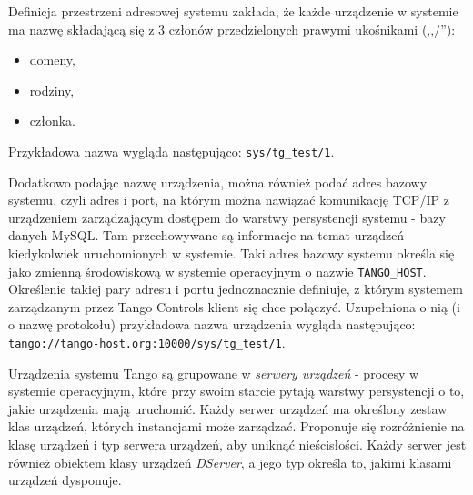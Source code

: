 Definicja przestrzeni adresowej systemu zakłada, że każde urządzenie w systemie ma nazwę składającą się z 3 członów przedzielonych prawymi ukośnikami (,,/''):
\begin{itemize}
    \item domeny,
    \item rodziny,
    \item członka.
\end{itemize}
Przykładowa nazwa wygląda następująco: \texttt{sys/tg\_test/1}.

Dodatkowo podając nazwę urządzenia, można również podać adres bazowy systemu, czyli adres i port, na którym można nawiązać komunikację TCP/IP z urządzeniem zarządzającym dostępem do warstwy persystencji systemu - bazy danych MySQL. Tam przechowywane są informacje na temat urządzeń kiedykolwiek uruchomionych w systemie. Taki adres bazowy systemu określa się jako zmienną środowiskową w systemie operacyjnym o nazwie \texttt{TANGO\_HOST}. Określenie takiej pary adresu i portu jednoznacznie definiuje, z którym systemem zarządzanym przez Tango Controls klient się chce połączyć. Uzupełniona o nią (i o nazwę protokołu) przykładowa nazwa urządzenia wygląda następująco: \texttt{tango://tango-host.org:10000/sys/tg\_test/1}.

Urządzenia systemu Tango są grupowane w \emph{serwery urządzeń} - procesy w systemie operacyjnym, które przy swoim starcie pytają warstwy persystencji o to, jakie urządzenia mają uruchomić. Każdy serwer urządzeń ma określony zestaw klas urządzeń, których instancjami może zarządzać. Proponuje się rozróżnienie na klasę urządzeń i typ serwera urządzeń, aby uniknąć nieścisłości. Każdy serwer jest również obiektem klasy urządzeń \emph{DServer}, a jego typ określa to, jakimi klasami urządzeń dysponuje.

